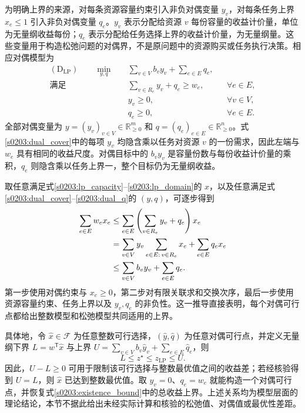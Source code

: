 为明确上界的来源，对每条资源容量约束引入非负对偶变量 $y_v$，对每条任务上界 $x_e\leq1$ 引入非负对偶变量 $q_e$。$y_v$ 表示分配给资源 $v$ 每份容量的收益计价量，单位为无量纲收益每份；$q_e$ 表示分配给任务选择上界的收益计价量，为无量纲量。这些变量用于构造松弛问题的对偶界，不是原问题中的资源购买或任务执行决策。相应对偶模型为
\begin{subequations}
\label{s0203:dual}
\begin{align}
 (\mathrm D_{\mathrm{LP}})\qquad
 \min_{y,q}\quad
 &\sum_{v\in V}b_vy_v+\sum_{e\in E}q_e,
 \label{s0203:dual_objective}\\
 \text{满足}\quad
 &\sum_{v\in R_e}y_v+q_e\geq w_e,
 &&\forall e\in E,
 \label{s0203:dual_cover}\\
 &y_v\geq0,
 &&\forall v\in V,
 \label{s0203:dual_y}\\
 &q_e\geq0,
 &&\forall e\in E.
 \label{s0203:dual_q}
\end{align}
\end{subequations}
全部对偶变量为 $y=(y_v)_{v\in V}\in\mathbb R_{\geq0}^{m}$ 和 $q=(q_e)_{e\in E}\in\mathbb R_{\geq0}^{n}$。式\eqref{s0203:dual_cover}中的每项 $y_v$ 均隐含乘以任务对资源 $v$ 的一份需求，因此左端与 $w_e$ 具有相同的收益尺度。对偶目标中的 $b_vy_v$ 是容量份数与每份收益计价量的乘积，$q_e$ 则隐含乘以任务上界一，整个目标仍为无量纲收益。

取任意满足式\eqref{s0203:lp_capacity}--\eqref{s0203:lp_domain}的 $x$，以及任意满足式\eqref{s0203:dual_cover}--\eqref{s0203:dual_q}的 $(y,q)$，可逐步得到
\begin{align}
 \sum_{e\in E}w_e x_e
 &\leq\sum_{e\in E}
 \left(\sum_{v\in R_e}y_v+q_e\right)x_e
 \notag\\
 &=\sum_{v\in V}y_v
 \sum_{e\in E:\,v\in R_e}x_e
 +\sum_{e\in E}q_e x_e
 \notag\\
 &\leq\sum_{v\in V}b_vy_v+\sum_{e\in E}q_e.
 \label{s0203:weak_duality}
\end{align}
第一步使用对偶约束与 $x_e\geq0$，第二步对有限关联求和交换次序，最后一步使用资源容量约束、任务上界以及 $y_v,q_e$ 的非负性。这一推导直接表明，每个对偶可行点都给出整数模型和松弛模型共同适用的上界。

具体地，令 $\widehat x\in\mathcal F$ 为任意整数可行选择，$(\widehat y,\widehat q)$ 为任意对偶可行点，并定义无量纲下界 $L=w^{\mathsf T}\widehat x$ 与上界 $U=\sum_{v\in V}b_v\widehat y_v+\sum_{e\in E}\widehat q_e$，则
\begin{equation}
 L\leq z^\star\leq z_{\mathrm{LP}}\leq U.
 \label{s0203:bound_chain}
\end{equation}
因此，$U-L\geq0$ 可用于限制该可行选择与整数最优值之间的收益差；若经核验得到 $U=L$，则 $\widehat x$ 已达到整数最优值。取 $y_v=0$、$q_e=w_e$ 就能构造一个对偶可行点，并恢复式\eqref{s0203:existence_bound}中的总收益上界。上述关系均为模型层面的理论结论，本节不据此给出未经实际计算和核验的松弛值、对偶值或最优性差距。
